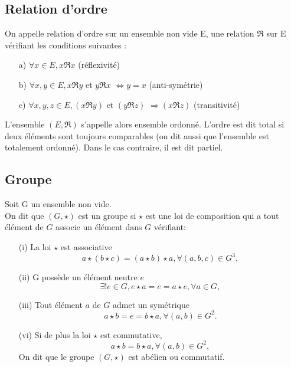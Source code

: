 \subsection{Relation d'ordre}
\begin{madefinition}
	On appelle relation d’ordre sur un ensemble non vide E, une relation
	$\Re $ sur E vérifiant les conditions suivantes :
	\begin{enumerate}
		\item[a)] $\forall x \in E, x\Re x$ (réflexivité)
		\item[b)] $\forall x,y \in E, x\Re y $ et $y\Re x$ $ \Longleftrightarrow y = x $ (anti-symétrie)
		\item[c)] $\forall x,y,z \in E, (x\Re y)$ et $(y\Re z)$ $\Longrightarrow (x\Re z)$  (transitivité)
	\end{enumerate}
	L'ensemble $(E, \Re )$ s'appelle alors ensemble ordonné. L'ordre est dit total si deux éléments sont toujours comparables (on dit aussi que l'ensemble est totalement ordonné). Dans le cas contraire, il est dit partiel.
\end{madefinition}

\subsection{Groupe}
\begin{madefinition}
	Soit G un ensemble non vide.\\
	On dit que $(G, \star)$ est un groupe si $\star$ est une loi de composition qui a tout élément de $G$ associe un élément dans $G$ vérifiant:
	\begin{enumerate}
		\item[(i)] La loi $\star$ est associative 
		\[ a\star(b\star c) = (a\star b) \star a, \forall (a,b,c) \in G^3,\]
		\item[(ii)] G possède un élément neutre $e$
		\[ \exists!e \in G, e\star a = e =  a\star e, \forall a \in G,\]
		\item[(iii)] Tout élément $a$ de $G$ admet un symétrique
		\[ a\star b = e = b \star a, \forall (a,b) \in G^2.\]
		\item [(vi)] Si de plus la loi $\star$ est commutative, 
		\[ a\star b = b \star a, \forall (a,b) \in G^2,\]
		On dit que le groupe $(G,\star)$ est abélien ou commutatif.
	\end{enumerate}
\end{madefinition}
